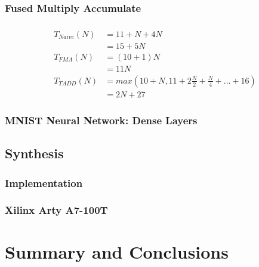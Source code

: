 \documentclass[a4paper,9pt]{report}
\begin{document}
\subsection{Fused Multiply Accumulate}




\subsection{}

\begin{align*}
  T_{Naive}(N) &= 11+N + 4N \\
  &= 15 + 5N \\
  T_{FMA}(N) &= (10+1)N \\
             &= 11N \\
  T_{TADD}(N) &= max(10+N, 11+2\frac{N}{2} + \frac{N}{4} + ... + 16) \\
             &= 2N+27 
\end{align*}


\subsection{MNIST Neural Network: Dense Layers}

\section{Synthesis}
\subsection{Implementation}
\subsection{Xilinx Arty A7-100T}

\chapter{Summary and Conclusions} 



\appendix
\singlespacing

 
% 
\end{document}
